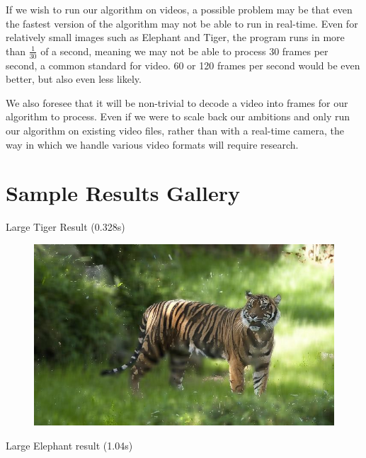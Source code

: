 \documentclass[12pt]{article}
\begin{document}
If we wish to run our algorithm on videos, a possible problem may be that even
the fastest version of the algorithm may not be able to run in real-time. Even
for relatively small images such as Elephant and Tiger, the program runs in
more than $\tfrac{1}{30}$ of a second, meaning we may not be able to process 30
frames per second, a common standard for video. 60 or 120 frames per second
would be even better, but also even less likely.

We also foresee that it will be non-trivial to decode a video into frames for
our algorithm to process. Even if we were to scale back our ambitions and only
run our algorithm on existing video files, rather than with a real-time camera,
the way in which we handle various video formats will require research.

\section{Sample Results Gallery}
Large Tiger Result (0.328s)
\begin{figure}[!htb]
    \includegraphics[width=0.9\linewidth]{large_tiger_portrait.jpg}
\end{figure}
Large Elephant result (1.04s)
\end{document}
